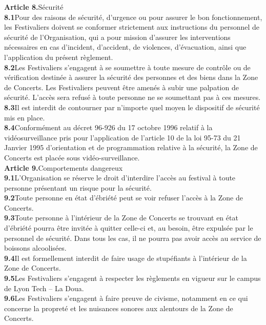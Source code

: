 \documentclass[hidelinks, paper=a4, fontsize=13pt]{report}
\begin{document}
\textbf{Article 8.}\hspace{3mm}Sécurité\\
\textbf{8.1}\hspace{3mm}Pour des raisons de sécurité, d’urgence ou pour assurer le bon fonctionnement, les Festivaliers doivent se conformer strictement aux instructions du personnel de sécurité de l’Organisation, qui a pour mission d’assurer les interventions nécessaires en cas d’incident, d’accident, de violences, d’évacuation, ainsi que l’application du présent règlement.\\
\textbf{8.2}\hspace{3mm}Les Festivaliers s’engagent à se soumettre à toute mesure de contrôle ou de vérification destinée à assurer la sécurité des personnes et des biens dans la Zone de Concerts. Les Festivaliers peuvent être amenés à subir une palpation de sécurité. L’accès sera refusé à toute personne ne se soumettant pas à ces mesures.\\
\textbf{8.3}\hspace{3mm}Il est interdit de contourner par n’importe quel moyen le dispositif de sécurité mis en place.\\
\textbf{8.4}\hspace{3mm}Conformément au décret 96-926 du 17 octobre 1996 relatif à la vidéosurveillance pris pour l’application de l’article 10 de la loi 95-73 du 21 Janvier 1995 d’orientation et de programmation relative à la sécurité, la Zone de Concerts est placée sous vidéo-surveillance.\\


\textbf{Article 9.}\hspace{3mm}Comportements dangereux\\
\textbf{9.1}\hspace{3mm}L’Organisation se réserve le droit d’interdire l’accès au festival à toute personne présentant un risque pour la sécurité.\\
\textbf{9.2}\hspace{3mm}Toute personne en état d’ébriété peut se voir refuser l’accès à la Zone de Concerts. \\
\textbf{9.3}\hspace{3mm}Toute personne à l’intérieur de la Zone de Concerts se trouvant en état d’ébriété pourra être invitée à quitter celle-ci et, au besoin, être expulsée par le personnel de sécurité. Dans tous les cas, il ne pourra pas avoir accès au service de boissons alcoolisées.\\
\textbf{9.4}\hspace{3mm}Il est formellement interdit de faire usage de stupéfiants à l’intérieur de la Zone de Concerts.\\
\textbf{9.5}\hspace{3mm}Les Festivaliers s’engagent à respecter les règlements en vigueur sur le campus de Lyon Tech – La Doua.\\
\textbf{9.6}\hspace{3mm}Les Festivaliers s’engagent à faire preuve de civisme, notamment en ce qui concerne la propreté et les nuisances sonores aux alentours de la Zone de Concerts.\\
\end{document}

